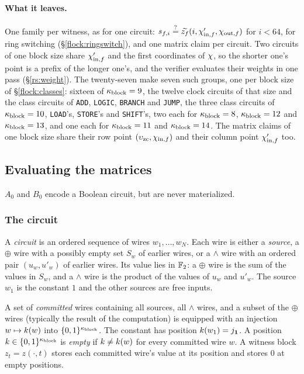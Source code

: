 \paragraph{What it leaves.} One family per witness, as for one circuit: $s_{f,i}\stackrel{?}{=}\widetilde{z_f}(i,\chi'_{\mathrm{in},f},\chi_{\mathrm{out},f})$ for $i<64$, for ring switching (\S\ref{flock:ringswitch}), and one matrix claim per circuit. Two circuits of one block size share $\chi'_{\mathrm{in},f}$ and the first coordinates of $\chi$, so the shorter one's point is a prefix of the longer one's, and the verifier evaluates their weights in one pass (\S\ref{rs:weight}). The twenty-seven make seven such groups, one per block size of \S\ref{flock:classes}: sixteen of $\kappa_{\mathrm{block}}=9$, the twelve clock circuits of that size and the class circuits of \texttt{ADD}, \texttt{LOGIC}, \texttt{BRANCH} and \texttt{JUMP}, the three class circuits of $\kappa_{\mathrm{block}}=10$, \texttt{LOAD}'s, \texttt{STORE}'s and \texttt{SHIFT}'s, two each for $\kappa_{\mathrm{block}}=8$, $\kappa_{\mathrm{block}}=12$ and $\kappa_{\mathrm{block}}=13$, and one each for $\kappa_{\mathrm{block}}=11$ and $\kappa_{\mathrm{block}}=14$. The matrix claims of one block size share their row point $(\upsilon_{\mathrm{zc}},\chi_{\mathrm{in},f})$ and their column point $\chi'_{\mathrm{in},f}$ too.

\subsection{Evaluating the matrices}\label{flock:matrices}

$A_0$ and $B_0$ encode a Boolean circuit, but are never materialized.

\subsubsection{The circuit}\label{flock:circuit}

\begin{definition}[Circuit]\label{def:circuit}
A \emph{circuit} is an ordered sequence of wires $w_1,\ldots,w_N$. Each wire is either a \emph{source}, a $\oplus$ wire with a possibly empty set $S_w$ of earlier wires, or a $\wedge$ wire with an ordered pair $(u_w,u'_w)$ of earlier wires. Its value lies in $\mathbb{F}_2$: a $\oplus$ wire is the sum of the values in $S_w$, and a $\wedge$ wire is the product of the values of $u_w$ and $u'_w$. The source $w_1$ is the constant $1$ and the other sources are free inputs.

A set of \emph{committed} wires containing all sources, all $\wedge$ wires, and a subset of the $\oplus$ wires (typically the result of the computation) is equipped with an injection $w\mapsto k(w)$ into $\{0,1\}^{\kappa_{\mathrm{block}}}$. The constant has position $k(w_1)=j_{\mathbf{1}}$. A position $k\in\{0,1\}^{\kappa_{\mathrm{block}}}$ is \emph{empty} if $k\neq k(w)$ for every committed wire $w$. A witness block $z_t=z(\cdot,t)$ stores each committed wire's value at its position and stores $0$ at empty positions.
\end{definition}

